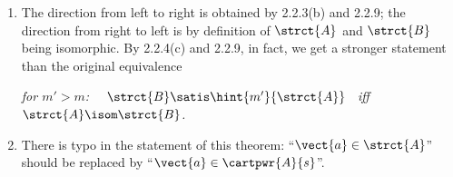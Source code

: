 \begin{enumerate}[1.]
\begin{center}
there is a an $a \in A$ such that for all $b \in B$, the spoiler wins $\game{m - 1}(\strct{A}, \vect{a}a, \strct{B}, \vect{b}b)$.
\end{center}
Hence, by 2.2.4(b) (also see the discussion in \textbf{Note on Lemma 2.2.4}), we have that the spoiler wins $\game{m}(\strct{A}, \vect{a}, \strct{B}, \vect{b})$. The other case that $\strct{A} \not\satis \varphi[\vect{a}]$ and $\strct{B} \satis \varphi[\vect{b}]$ can be handled symmetrically.\qed
\newpar
The above discussion now makes it clear that the spoiler's winning strategy for the game $\game{m}(\strct{A}, \vect{a}, \strct{B}, \vect{b})$ consists of always choosing an appropriate element for the existential quantifier $\exists$ from the corresponding structure. Thus, a winning strategy for the spoiler can be converted into a formula, and vice versa.
\newpar
In general, however, the more typical use is to come up with a winning strategy for the spoiler and turn it into a formula to distinguish $(\strct{A}, \vect{a})$ and $(\strct{B}, \vect{b})$; likewise, it is more useful to conclude they are indistinguishable by presenting a winning strategy for the duplicator.
%
\item {} The direction from left to right is obtained by 2.2.3(b) and 2.2.9; the direction from right to left is by definition of $\strct{A}$ and $\strct{B}$ being isomorphic.
\newpar
By 2.2.4(c) and 2.2.9, in fact, we get a stronger statement than the original equivalence
\begin{center}
\emph{for $m' > m$: \ \ $\strct{B} \satis \hint{m'}{\strct{A}}$ \ iff \ $\strct{A} \isom \strct{B}$.}
\end{center}
%
\item {} There is typo in the statement of this theorem: ``$\vect{a} \in \strct{A}$'' should be replaced by ``$\vect{a} \in \cartpwr{A}{s}$''.
%
\end{enumerate}


